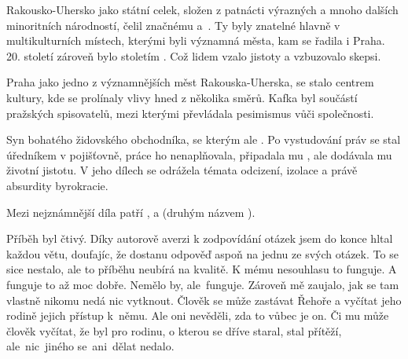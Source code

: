 \documentclass{extarticle} %
\begin{document}

\noindent Rakousko-Uhersko jako státní celek,
složen z patnácti výrazných a mnoho dalších minoritních národností,
čelil značnému  a~.
Ty byly znatelné hlavně v multikulturních místech, kterými byli významná města, kam se řadila i Praha.
20. století zároveň bylo stoletím .
Což lidem vzalo jistoty a vzbuzovalo skepsi.

\noindent Praha jako jedno z významnějších měst Rakouska-Uherska, se stalo centrem kultury,
kde se prolínaly vlivy hned z několika směrů.
Kafka byl součástí pražských spisovatelů, mezi kterými převládala pesimismus vůči společnosti.



\noindent Syn bohatého židovského obchodníka, se kterým ale .
Po vystudování práv se stal úředníkem v pojišťovně, práce ho nenaplňovala,
připadala mu , ale dodávala mu životní jistotu.
V jeho dílech se odrážela témata odcizení, izolace a právě absurdity byrokracie.


\noindent 
Mezi nejznámnější díla patří , 
a  (druhým názvem ).






\noindent Příběh byl čtivý. Díky autorově averzi k zodpovídání otázek jsem do konce hltal každou větu,
doufajíc, že dostanu odpověď aspoň na jednu ze svých otázek.
To se sice nestalo, ale to příběhu neubírá na kvalitě.
K mému nesouhlasu to funguje. A funguje to až moc dobře.
Nemělo by, ale~funguje. Zároveň mě zaujalo, jak se tam vlastně nikomu nedá nic vytknout.
Člověk se může zastávat Řehoře a vyčítat jeho rodině jejich přístup k~němu.
Ale oni nevěděli, zda to vůbec je on.
Či mu může člověk vyčítat, že byl pro rodinu, o kterou se dříve staral, stal přítěží,
ale~nic~jiného se~ani~dělat nedalo.
\end{document}
